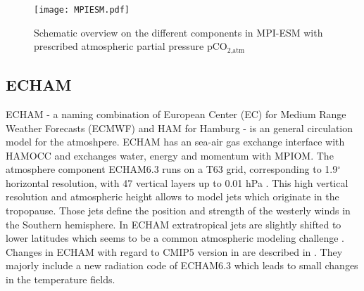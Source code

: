 \begin{figure}[h!]
	\centering 
	\texttt{[image: MPIESM.pdf]}
	\caption{Schematic overview on the different components in \ac{MPI-ESM} with prescribed atmospheric  partial pressure pCO$_{\text{2,atm}}$ \citep{Giorgetta2013}}
	\label{fig:MPIESM}
\end{figure}



\subsection{ECHAM}
\acs{ECHAM} - a naming combination of European Center (EC) for Medium Range Weather Forecasts (ECMWF) and HAM for Hamburg -  is an general circulation model for the atmoshpere. \acs{ECHAM} has an sea-air gas exchange interface with HAMOCC and exchanges water, energy and momentum with \acs{MPIOM}. 
The atmosphere component \acs{ECHAM}6.3 runs on a T63 grid, corresponding to 1.9$^\circ$ horizontal resolution, with 47 vertical layers up to 0.01 hPa \citep{Stevens2013}. 
This high vertical resolution and atmospheric height allows to model jets which originate in the tropopause. Those jets define the position and strength of the westerly winds in the Southern hemisphere.  In \acs{ECHAM} extratropical jets are slightly shifted to lower latitudes \citep{Stevens2013} which seems to be a common atmospheric modeling challenge \citep{Kidston2010}.
Changes in \acs{ECHAM} with regard to CMIP5 version in \cite{Stevens2013} are described in \cite{Bittner2016}. They majorly include a new radiation code of \acs{ECHAM}6.3 which leads to small changes in the temperature fields.  


